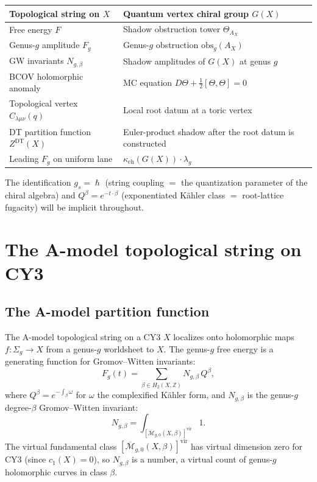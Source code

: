 \documentclass[11pt]{amsart}
\theoremstyle{plain}
\theoremstyle{definition}
\theoremstyle{remark}
\renewcommand{\hbar}{\hslash}
\newcommand{\Mbar}{\overline{\mathcal{M}}}
\newcommand{\DT}{\mathrm{DT}}
\begin{document}
\begin{center}
\renewcommand{\arraystretch}{1.5}
\begin{tabular}{ll}
 \hline
 \textbf{Topological string on $X$} & \textbf{Quantum vertex chiral group $G(X)$} \\
 \hline
 Free energy $F$ & Shadow obstruction tower $\Theta_{A_X}$ \\
 Genus-$g$ amplitude $F_g$ & Genus-$g$ obstruction $\mathrm{obs}_g(A_X)$ \\
 GW invariants $N_{g,\beta}$ & Shadow amplitudes of $G(X)$ at genus $g$ \\
 BCOV holomorphic anomaly & MC equation $D\Theta + \tfrac{1}{2}[\Theta,\Theta] = 0$ \\
 Topological vertex $C_{\lambda\mu\nu}(q)$ & Local root datum at a toric vertex \\
 DT partition function $Z^{\DT}(X)$ & Euler-product shadow after the root datum is constructed \\
 Leading $F_g$ on uniform lane & $\kappa_{\mathrm{ch}}(G(X)) \cdot \lambda_g$ \\
 \hline
\end{tabular}
\end{center}

\noindent
The identification $g_s = \hbar$ (string coupling $=$ the quantization
parameter of the chiral algebra) and $Q^\beta = e^{-t \cdot \beta}$
(exponentiated K\"ahler class $=$ root-lattice fugacity) will be implicit
throughout.


\section{The A-model topological string on CY3}
\label{sec:a-model}

\subsection{The A-model partition function}
\label{sub:a-model-partition}

The A-model topological string on a CY3 $X$ localizes onto holomorphic maps
$f \colon \Sigma_g \to X$ from a genus-$g$ worldsheet to $X$. The genus-$g$
free energy is a generating function for Gromov--Witten invariants:
\begin{equation}\label{eq:fg-a}
 F_g(t) = \sum_{\beta \in H_2(X,\mathbb{Z})} N_{g,\beta}\, Q^\beta,
\end{equation}
where $Q^\beta = e^{-\int_\beta \omega}$ for $\omega$ the complexified
K\"ahler form, and $N_{g,\beta}$ is the genus-$g$ degree-$\beta$
Gromov--Witten invariant:
\[
 N_{g,\beta} = \int_{[\Mbar_{g,0}(X,\beta)]^{\mathrm{vir}}} 1.
\]
The virtual fundamental class $[\Mbar_{g,0}(X,\beta)]^{\mathrm{vir}}$ has
virtual dimension zero for CY3 (since $c_1(X) = 0$), so $N_{g,\beta}$ is
a number, a virtual count of genus-$g$ holomorphic curves in class
$\beta$.
\end{document}
